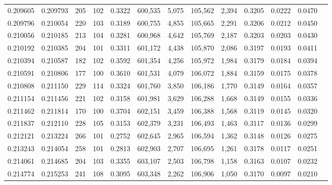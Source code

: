\begin{tabular}{rrrrrrrrrrrrr}
0.209605 & 0.209793 &   205 & 102 &                                     0.3322 & 600,535 &   5,075 & 105,562 &   2,394 & 0.3205 & 0.0222 & 0.0470 \\
0.209796 & 0.210054 &   220 & 103 &                                     0.3189 & 600,755 &   4,855 & 105,665 &   2,291 & 0.3206 & 0.0212 & 0.0450 \\
0.210056 & 0.210185 &   213 & 104 &                                     0.3281 & 600,968 &   4,642 & 105,769 &   2,187 & 0.3203 & 0.0203 & 0.0430 \\
0.210192 & 0.210385 &   204 & 101 &                                     0.3311 & 601,172 &   4,438 & 105,870 &   2,086 & 0.3197 & 0.0193 & 0.0411 \\
0.210394 & 0.210587 &   182 & 102 &                                     0.3592 & 601,354 &   4,256 & 105,972 &   1,984 & 0.3179 & 0.0184 & 0.0394 \\
0.210591 & 0.210806 &   177 & 100 &                                     0.3610 & 601,531 &   4,079 & 106,072 &   1,884 & 0.3159 & 0.0175 & 0.0378 \\
0.210808 & 0.211150 &   229 & 114 &                                     0.3324 & 601,760 &   3,850 & 106,186 &   1,770 & 0.3149 & 0.0164 & 0.0357 \\
0.211154 & 0.211456 &   221 & 102 &                                     0.3158 & 601,981 &   3,629 & 106,288 &   1,668 & 0.3149 & 0.0155 & 0.0336 \\
0.211462 & 0.211814 &   170 & 100 &                                     0.3704 & 602,151 &   3,459 & 106,388 &   1,568 & 0.3119 & 0.0145 & 0.0320 \\
0.211837 & 0.212110 &   228 & 105 &                                     0.3153 & 602,379 &   3,231 & 106,493 &   1,463 & 0.3117 & 0.0136 & 0.0299 \\
0.212121 & 0.213224 &   266 & 101 &                                     0.2752 & 602,645 &   2,965 & 106,594 &   1,362 & 0.3148 & 0.0126 & 0.0275 \\
0.213243 & 0.214054 &   258 & 101 &                                     0.2813 & 602,903 &   2,707 & 106,695 &   1,261 & 0.3178 & 0.0117 & 0.0251 \\
0.214061 & 0.214685 &   204 & 103 &                                     0.3355 & 603,107 &   2,503 & 106,798 &   1,158 & 0.3163 & 0.0107 & 0.0232 \\
0.214774 & 0.215253 &   241 & 108 &                                     0.3095 & 603,348 &   2,262 & 106,906 &   1,050 & 0.3170 & 0.0097 & 0.0210 \\

\end{tabular}
